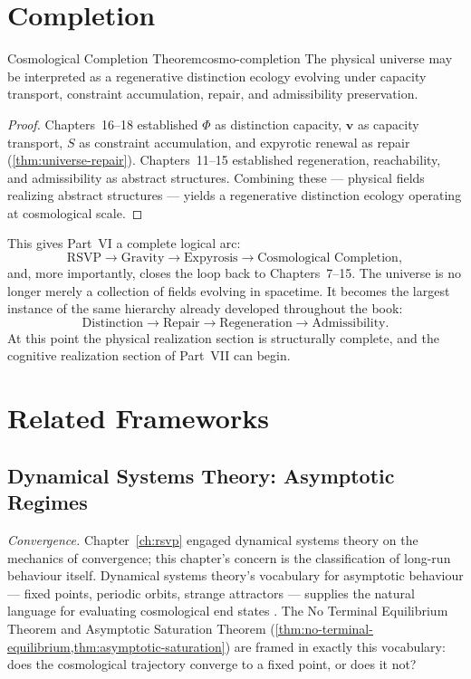 \documentclass[12pt,twoside,openright]{book}
\begin{document}
\section{Completion}
\label{sec:ch19-completion}

\begin{theorem}{Cosmological Completion Theorem}{cosmo-completion}
  The physical universe may be interpreted as a
  regenerative distinction ecology evolving under capacity
  transport, constraint accumulation, repair, and
  admissibility preservation.
\end{theorem}

\begin{proof}
  Chapters~16--18 established $\Phi$ as distinction
  capacity, $\mathbf{v}$ as capacity transport, $S$ as
  constraint accumulation, and expyrotic renewal as repair
  (\cref{thm:universe-repair}). Chapters~11--15 established
  regeneration, reachability, and admissibility as abstract
  structures. Combining these — physical fields realizing
  abstract structures — yields a regenerative distinction
  ecology operating at cosmological scale.
\end{proof}

This gives Part~VI a complete logical arc:
\[
  \text{RSVP} \to \text{Gravity} \to \text{Expyrosis}
  \to \text{Cosmological Completion},
\]
and, more importantly, closes the loop back to
Chapters~7--15. The universe is no longer merely a
collection of fields evolving in spacetime. It becomes the
largest instance of the same hierarchy already developed
throughout the book:
\[
  \text{Distinction} \to \text{Repair} \to \text{Regeneration}
  \to \text{Admissibility}.
\]
At this point the physical realization section is
structurally complete, and the cognitive realization
section of Part~VII can begin.

\section{Related Frameworks}
\label{sec:ch19-related-frameworks}

\subsection*{Dynamical Systems Theory: Asymptotic Regimes}

\emph{Convergence.} Chapter~\ref{ch:rsvp} engaged dynamical
systems theory on the mechanics of convergence; this chapter's
concern is the classification of long-run behaviour itself.
Dynamical systems theory's vocabulary for asymptotic
behaviour --- fixed points, periodic orbits, strange attractors
--- supplies the natural language for evaluating cosmological
end states \parencite{strogatz2015,arnold1989}. The No Terminal
Equilibrium Theorem and Asymptotic Saturation Theorem
(\cref{thm:no-terminal-equilibrium,thm:asymptotic-saturation})
are framed in exactly this vocabulary: does the cosmological
trajectory converge to a fixed point, or does it not?
\end{document}
